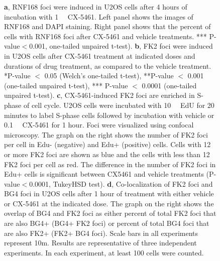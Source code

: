 \begin{figure}
  \caption[]{
        \newline
        \textbf{a}, RNF168 foci were induced in U2OS cells after 4 hours of incubation with \SI{1}{\micro\Molar} CX-5461. Left panel shows the images of RNF168 and DAPI staining. Right panel shows that the percent of cells with RNF168 foci after CX-5461 and vehicle treatments. *** P-value$<$0.001, one-tailed unpaired t-test).  
        \newline
        \textbf{b}, FK2 foci were induced in U2OS cells after CX-5461 treatment at indicated doses and durations of drug treatment, as compared to the vehicle treatment. *P-value $<$ 0.05 (Welch's one-tailed t-test), **P-value $<$ 0.001 (one-tailed unpaired t-test), *** P-value $<$ 0.0001 (one-tailed unpaired t-test).
        \newline
        \textbf{c}, CX-5461-induced FK2 foci are enriched in S-phase of cell cycle. U2OS cells were incubated with \SI{10}{\micro\Molar} EdU for 20 minutes to label S-phase cells followed by incubation with vehicle or \SI{0.1}{\micro\Molar} CX-5461 for 1 hour. Foci were visualized using confocal microscopy. The graph on the right shows the number of FK2 foci per cell in Edu- (negative) and Edu+ (positive) cells. Cells with 12 or more FK2 foci are shown as blue and the cells with less than 12 FK2 foci per cell as red. The difference in the number of FK2 foci in Edu+ cells is significant between CX5461 and vehicle treatments (P-value$<0$.0001, TukeyHSD test).
        \newline
        \textbf{d}, Co-localization of FK2 foci and BG4 foci in U2OS cells after 1 hour of treatment with either vehicle or CX-5461 at the indicated dose. The graph on the right shows the overlap of BG4 and FK2 foci as either percent of total FK2 foci that are also BG4+ (BG4+ FK2 foci) or percent of total BG4 foci that are also FK2+ (FK2+ BG4 foci).   
        \newline
        Scale bars in all experiments represent \SI{10}{\micro}m. Results are representative of three independent experiments. In each experiment, at least 100 cells were counted.
        }
 \end{figure}
 \clearpage


